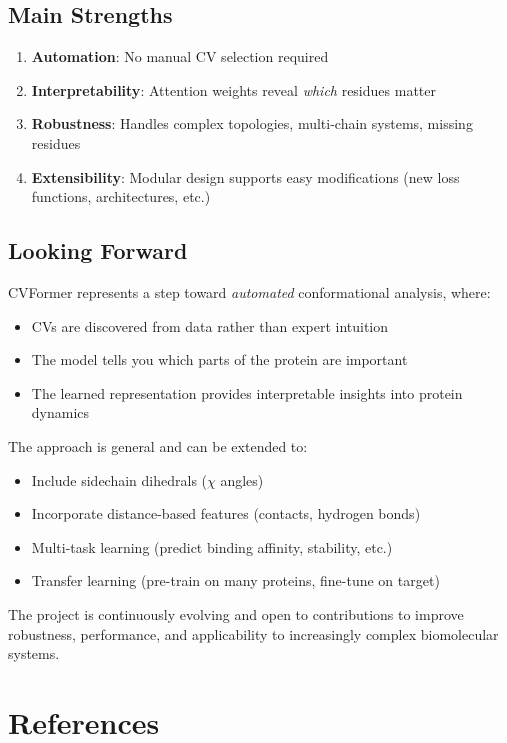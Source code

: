 \documentclass[12pt,a4paper]{article}
\begin{document}
\subsection{Main Strengths}

\begin{enumerate}
    \item \textbf{Automation}: No manual CV selection required
    \item \textbf{Interpretability}: Attention weights reveal \textit{which} residues matter
    \item \textbf{Robustness}: Handles complex topologies, multi-chain systems, missing residues
    \item \textbf{Extensibility}: Modular design supports easy modifications (new loss functions, architectures, etc.)
\end{enumerate}

\subsection{Looking Forward}

CVFormer represents a step toward \textit{automated} conformational analysis, where:
\begin{itemize}
    \item CVs are discovered from data rather than expert intuition
    \item The model tells you which parts of the protein are important
    \item The learned representation provides interpretable insights into protein dynamics
\end{itemize}

The approach is general and can be extended to:
\begin{itemize}
    \item Include sidechain dihedrals ($\chi$ angles)
    \item Incorporate distance-based features (contacts, hydrogen bonds)
    \item Multi-task learning (predict binding affinity, stability, etc.)
    \item Transfer learning (pre-train on many proteins, fine-tune on target)
\end{itemize}

The project is continuously evolving and open to contributions to improve robustness, performance, and applicability to increasingly complex biomolecular systems.

\section*{References}
\end{document}

